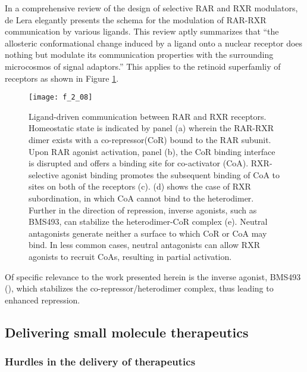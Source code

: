 \begin{refsection}
In a comprehensive review of the design of selective RAR and RXR modulators, de
Lera elegantly presents the schema for the modulation of RAR-RXR
communication by various ligands. This review aptly summarizes that ``the
allosteric conformational change induced by a ligand onto a nuclear receptor
does nothing but modulate its communication properties with the surrounding
microcosmos of signal adaptors.''\cite{DeLera2007} This applies to the retinoid
superfamliy of receptors as shown in Figure \ref{fig:RAR_communication}.
\begin{figure}[h!] \centering \texttt{[image: f\_2\_08]}
    \caption[Ligand-driven communication between RAR and RXR
    receptors.]{Ligand-driven communication between RAR and RXR receptors.
        Homeostatic state is indicated by panel (a) wherein the RAR-RXR dimer
        exists with a co-repressor(CoR) bound to the RAR subunit. Upon RAR
        agonist activation, panel (b), the CoR binding interface is disrupted
        and offers a binding site for co-activator (CoA). RXR-selective agonist
        binding promotes the subsequent binding of CoA to sites on both of the
        receptors (c). (d) shows the case of RXR subordination, in which CoA
        cannot bind to the heterodimer. Further in the direction of repression,
        inverse agonists, such as BMS493, can stabilize the heterodimer-CoR
        complex (e). Neutral antagonists generate neither a surface to which CoR or
        CoA may bind. In less common cases, neutral antagonists can allow RXR
        agonists to recruit CoAs, resulting in partial activation.\cite{DeLera2007}}\label{fig:RAR_communication} \end{figure}
Of specific relevance to the work presented herein is the inverse agonist,
BMS493 (), which
stabilizes the co-repressor/heterodimer complex, thus leading to enhanced
repression.\cite{Germain2002} 

\subsection{Delivering small molecule therapeutics}

\subsubsection{Hurdles in the delivery of therapeutics}


\end{refsection}
